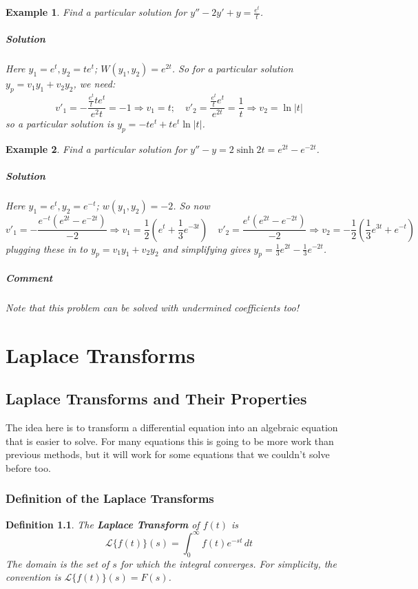 \documentclass[letterpaper, 11pt, openany]{book}
\theoremstyle{mytheoremstyle}
\newtheorem{definition}{Definition}[section]
\theoremstyle{myexamplestyle}
\newtheorem{example}{Example}[section]
\newenvironment{solution}{\paragraph{\sffamily \smaller \fontseries{b}\selectfont Solution}}{\hfill\faSquare}
\newenvironment{commentary}{\paragraph{\sffamily \smaller \fontseries{b}\selectfont Comment}}{}
\begin{document}
\begin{example}\label{e:de-2vop-exp}
    Find a particular solution for \(y'' - 2y' + y = \frac{e^t}{t}\).
    \begin{solution}
        Here \(y_1 = e^t, y_2 = t e^t\); \(W(y_1, y_2) = e^{2t}\). So for a particular solution \(y_p = v_1 y_1 + v_2 y_2\), we need:
        \[v'_1 = -\frac{\frac{e^t}{t} t e^t}{e^2t} = -1 \Rightarrow v_1 = t; \quad v'_2 = \frac{\frac{e^t}{t} e^t}{e^{2t}} = \frac{1}{t} \Rightarrow v_2 = \ln |t|\]
        so a particular solution is \(y_p = -t e^t + t e^t \ln |t|\).
    \end{solution}
\end{example}

\begin{example}\label{e:de-2vop-sinh}
    Find a particular solution for \(y'' - y = 2 \sinh 2t = e^{2t} - e^{-2t}\).
    \begin{solution}
        Here \(y_1 = e^t, y_2 = e^{-t}\); \(w(y_1, y_2) = -2\). So now
        \[v'_1 = - \frac{e^{-t}(e^{2t} - e^{-2t})}{-2} \Rightarrow v_1 = \frac{1}{2}\left(e^t + \frac{1}{3}e^{-3t}\right) \quad v'_2 = \frac{e^{t}(e^{2t} - e^{-2t})}{-2} \Rightarrow v_2 = -\frac{1}{2}\left(\frac{1}{3}e^{3t} + e^{-t}\right)\]
        plugging these in to \(y_p = v_1 y_1 + v_2 y_2\) and simplifying gives \(y_p = \frac{1}{3}e^{2t} - \frac{1}{3}e^{-2t}\).
    \end{solution}
    \begin{commentary}
        Note that this problem can be solved with undermined coefficients too! \faSmile
    \end{commentary}
\end{example}

\newpage\thispagestyle{firstofchapter}
\chapter{Laplace Transforms}
\setcounter{figure}{0}
\section{Laplace Transforms and Their Properties}
\setcounter{figure}{0}
The idea here is to transform a differential equation into an algebraic equation that is easier to solve. For many equations this is going to be more work than previous methods, but it will work for some equations that we couldn't solve before too.
\subsection{Definition of the Laplace Transforms}
\begin{definition}\label{d:Laplace-xform}
    The \textbf{Laplace Transform} of \(f(t)\) is
    \[\mathcal{L}\{f(t)\}(s) = \int_0^{\infty} f(t) e^{-st} \, dt\]
    The domain is the set of \(s\) for which the integral converges. For simplicity, the convention is \(\mathcal{L}\{f(t)\}(s) = F(s)\). 
\end{definition}
\end{document}
